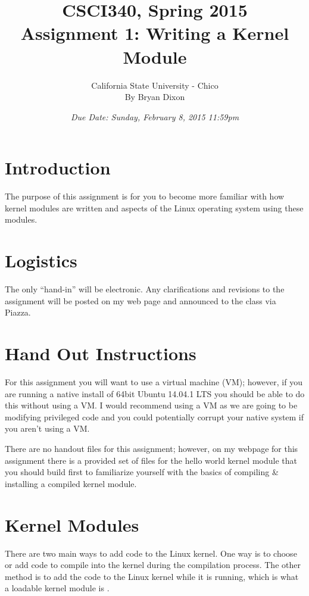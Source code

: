 \documentclass[11pt]{article}
\begin{document}
\title{CSCI340, Spring 2015\\
Assignment 1: Writing a Kernel Module
}

\author{California State University - Chico\\
  By Bryan Dixon\\
}
\date{\emph{Due Date: Sunday, February 8, 2015 11:59pm}}


\maketitle

\section*{Introduction}
The purpose of this assignment is for you to become more familiar with how kernel modules are written and aspects of the Linux operating system using these modules. 

\section*{Logistics}

The only ``hand-in'' will be electronic.  Any clarifications and revisions to the assignment will
be posted on my web page and announced to the class via Piazza.

\section*{Hand Out Instructions}

For this assignment you will want to use a virtual machine (VM); however, if you are running a native install of 64bit Ubuntu 14.04.1 LTS you should be able to do this without using a VM. I would recommend using a VM as we are going to be modifying privileged code and you could potentially corrupt your native system if you aren't using a VM. 

There are no handout files for this assignment; however, on my webpage for this assignment there is a provided set of files for the hello world kernel module that you should build first to familiarize yourself with the basics of compiling \& installing a compiled kernel module. 


\section*{Kernel Modules}

There are two main ways to add code to the Linux kernel. One way is to choose or add code to compile into the kernel during the compilation process. The other method is to add the code to the Linux kernel while it is running, which is what a loadable kernel module is \cite{tldp}.
\end{document}
